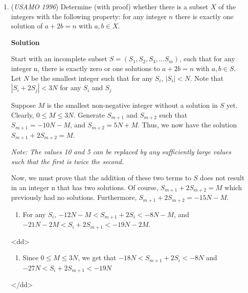 \begin{enumerate}
 Notice that
 \[\sin 20^\circ \sin 20^\circ \sin 40^\circ = 2 \sin 10^\circ \cos 10^\circ \sin 20^\circ \sin 40^\circ\]
 \[= \sin 10^\circ (\sin 10^\circ + \frac{1}{2}) \sin 40^\circ\]
 \[= \sin 10^\circ (\frac{1}{2} \sin 40^\circ + \frac{1}{2} (\cos 30^\circ - \cos 50^\circ))\]
 \[= \sin 10^\circ \frac{1}{2} \cos 30^\circ\]
 \[= \sin 10^\circ \sin 30^\circ \sin 60^\circ,\]as desired.

 


	\item (\textit{USAMO 1996}) Determine (with proof) whether there is a subset $X$ of the integers with the following property: for any integer $n$ there is exactly one solution of $a + 2b = n$ with $a,b \in X$.


 



\textbf{Solution}

Start with an incomplete subset $S = (S_1, S_2, S_3, ... S_m)$, such that for any integer n, there is exactly zero or one solutions to $a + 2b = n$ with $a,b \in S$. Let $N$ be the smallest integer such that for any $S_i$, $|S_i| < N$. Note that $|S_i+2S_j| < 3N$ for any $S_i$ and $S_j$

 
Suppose $M$ is the smallest non-negative integer without a solution in $S$ yet. Clearly, $0 \le M \le 3N$. Generate $S_{m+1}$ and $S_{m+2}$ such that $S_{m+1} = -10N - M$, and $S_{m+2} = 5N + M$. Thus, we now have the solution $S_{m+1}+2S_{m+2} = M$.

 \textit{Note: The values 10 and 5 can be replaced by any sufficiently large values such that the first is twice the second.}

 
Now, we must prove that the addition of these two terms to $S$ does not result in an integer n that has two solutions. Of course, $S_{m+1} + 2S_{m+2} = M$ which previously had no solutions. Furthermore, $S_{m+1} + 2S_{m+2} = -15N - M$.

 
            \begin{enumerate}[label=(\roman*)]
                \item For any $S_i$, $-12N - M < S_{m+1}+2S_i < -8N-M$, and $-21N - 2M < S_i+2S_{m+1} < -19N - 2M$.
            \end{enumerate}
            
            \begin{enumerate}[label=(\roman*)]
                <dd>
            \begin{enumerate}[label=(\roman*)]
                \item Since $0 \le M \le 3N$, we get that  $-18N < S_{m+1}+2S_i < -8N$ and $-27N < S_i+2S_{m+1} < -19N$
            \end{enumerate}
            </dd>
            \end{enumerate}
            

\end{enumerate}
